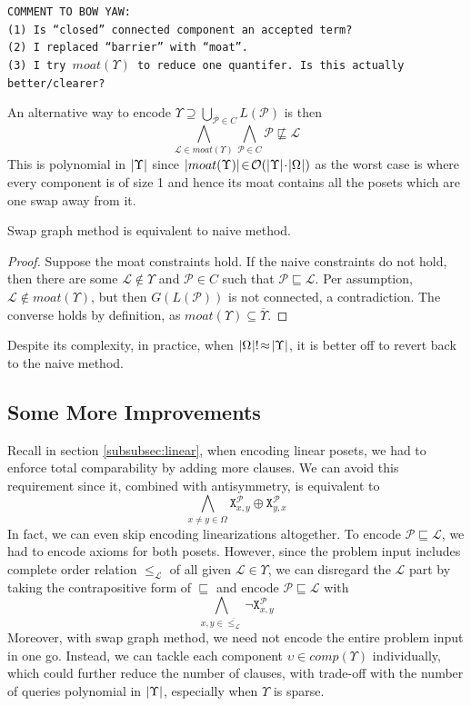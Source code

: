 \documentclass[12pt]{llncs}
\DeclarePairedDelimiter{\abs}{\lvert}{\rvert}
\let\oldleq\leq
\renewcommand{\leq}[1][]{\oldleq_{#1}}
\newcommand{\comment}[1]{\texttt{COMMENT TO BOW YAW:\\#1}}
\newcommand{\poset}[1]{\mathcal{#1}}
\newcommand{\uni}[1][]{\Omega_{#1}}
\newcommand{\lang}[1]{L(#1)}
\newcommand{\sgraph}[1]{G(#1)}
\newcommand{\lext}{\sqsubseteq}
\newcommand{\complmt}[1]{\overline{#1}}
\newcommand{\satvar}[2]{\mathtt{X}_{#1}^{#2}}
\newcommand{\bigo}[1]{\mathcal{O}(#1)}
\begin{document}
\comment{(1) Is ``closed'' connected component an accepted term?\\(2) I replaced ``barrier'' with ``moat''.\\(3) I try $moat(\Upsilon)$ to reduce one quantifer. Is this actually better/clearer?}

An alternative way to encode $\Upsilon \supseteq \bigcup_{\poset{P} \in C} \lang{\poset{P}}$ is then
\[
\bigwedge_{\poset{L} \in moat(\Upsilon)} \bigwedge_{\poset{P} \in C} \poset{P} \not\lext \poset{L}
\]
This is polynomial in $\abs{\Upsilon}$ since $\abs{moat(\Upsilon)} \!\in\! \bigo{\abs{\Upsilon} \!\cdot\! \abs{\uni}}$ as the worst case is where every component is of size 1 and hence its moat contains all the posets which are one swap away from it.

\begin{proposition}
    Swap graph method is equivalent to naive method.
\end{proposition}
\begin{proof}
    Suppose the moat constraints hold. If the naive constraints do not hold, then there are some $\poset{L} \!\not\in\! \Upsilon$ and $\poset{P} \!\in\! C$ such that $\poset{P} \lext \poset{L}$. Per assumption, $\poset{L} \!\not\in\! moat(\Upsilon)$, but then $\sgraph{\lang{\poset{P}}}$ is not connected, a contradiction. The converse holds by definition, as $moat(\Upsilon) \subseteq \complmt{\Upsilon}$.
\end{proof}

Despite its complexity, in practice, when $\abs{\uni}! \!\approx\! \abs{\Upsilon}$, it is better off to revert back to the naive method.

\subsection{Some More Improvements}
Recall in section \ref{subsubsec:linear}, when encoding linear posets, we had to enforce total comparability by adding more clauses. We can avoid this requirement since it, combined with antisymmetry, is equivalent to
\[
\bigwedge_{x \neq y \in \uni} \satvar{x,y}{\poset{P}} \oplus \satvar{y,x}{\poset{P}}
\]
In fact, we can even skip encoding linearizations altogether. To encode $\poset{P} \lext \poset{L}$, we had to encode axioms for both posets. However, since the problem input includes complete order relation $\leq[\poset{L}]$ of all given $\poset{L} \!\in\! \Upsilon$, we can disregard the $\poset{L}$ part by taking the contrapositive form of $\lext$ and encode $\poset{P} \lext \poset{L}$ with
\[
\bigwedge_{x,y \in \complmt{\leq[\poset{L}]}} \neg \satvar{x,y}{\poset{P}}
\]
Moreover, with swap graph method, we need not encode the entire problem input in one go. Instead, we can tackle each component $\upsilon \!\in\! comp(\Upsilon)$ individually, which could further reduce the number of clauses, with trade-off with the number of queries polynomial in $\abs{\Upsilon}$, especially when $\Upsilon$ is sparse.
\end{document}
